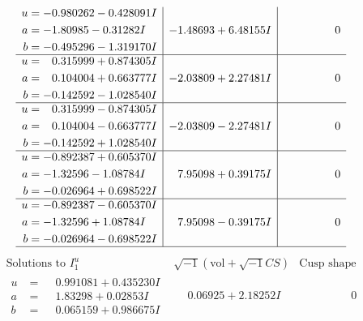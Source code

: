 \documentclass[1p]{elsarticle_modified}
\theoremstyle{definition}
\newcommand{\I}{\sqrt{-1}}
\begin{document}
$$\begin{array}{c|c|c}
\begin{aligned}
u &= -0.980262 - 0.428091 I \\
a &= -1.80985 - 0.31282 I \\
b &= -0.495296 - 1.319170 I\end{aligned}
 & -1.48693 + 6.48155 I & \phantom{-0.000000 } 0 \\ \hline\begin{aligned}
u &= \phantom{-}0.315999 + 0.874305 I \\
a &= \phantom{-}0.104004 + 0.663777 I \\
b &= -0.142592 - 1.028540 I\end{aligned}
 & -2.03809 + 2.27481 I & \phantom{-0.000000 } 0 \\ \hline\begin{aligned}
u &= \phantom{-}0.315999 - 0.874305 I \\
a &= \phantom{-}0.104004 - 0.663777 I \\
b &= -0.142592 + 1.028540 I\end{aligned}
 & -2.03809 - 2.27481 I & \phantom{-0.000000 } 0 \\ \hline\begin{aligned}
u &= -0.892387 + 0.605370 I \\
a &= -1.32596 - 1.08784 I \\
b &= -0.026964 + 0.698522 I\end{aligned}
 & \phantom{-}7.95098 + 0.39175 I & \phantom{-0.000000 } 0 \\ \hline\begin{aligned}
u &= -0.892387 - 0.605370 I \\
a &= -1.32596 + 1.08784 I \\
b &= -0.026964 - 0.698522 I\end{aligned}
 & \phantom{-}7.95098 - 0.39175 I & \phantom{-0.000000 } 0\\
 \hline 
 \end{array}$$\newpage$$\begin{array}{c|c|c}  
\text{Solutions to }I^u_{1}& \I (\text{vol} + \sqrt{-1}CS) & \text{Cusp shape}\\
 \hline 
\begin{aligned}
u &= \phantom{-}0.991081 + 0.435230 I \\
a &= \phantom{-}1.83298 + 0.02853 I \\
b &= \phantom{-}0.065159 + 0.986675 I\end{aligned}
 & \phantom{-}0.06925 + 2.18252 I & \phantom{-0.000000 } 0 \\ \hline\begin{aligned}

\end{aligned}
\end{array}$$
\end{document}
